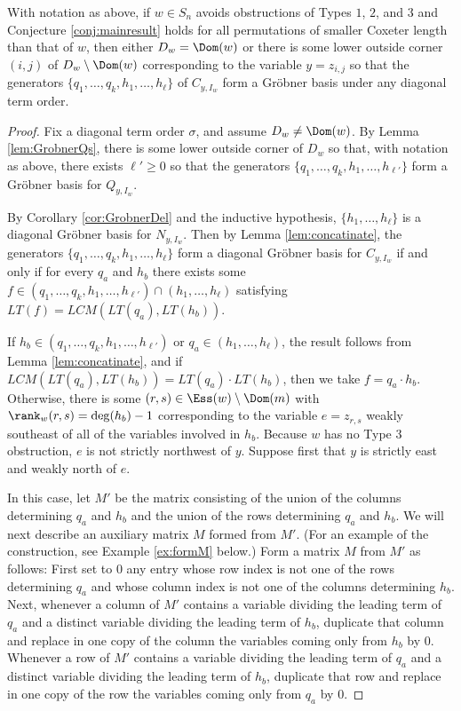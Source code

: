 \begin{lemma}\label{lem:GrobnerLink}
With notation as above, if $w \in S_n$ avoids obstructions of Types $1$, $2$, and $3$ and Conjecture \ref{conj:mainresult} holds for all permutations of smaller Coxeter length than that of $w$, then either $D_w = \Dom(w)$ or there is some lower outside corner $(i,j)$ of $D_w \setminus \Dom(w)$ corresponding to the variable $y = z_{i,j}$ so that the generators $\{q_1, \ldots, q_k, h_1, \ldots, h_\ell\}$ of $C_{y,I_w}$ form a Gr\"obner basis under any diagonal term order.
\end{lemma}
\begin{proof}
Fix a diagonal term order $\sigma$, and assume $D_w \neq \Dom(w)$.  By Lemma \ref{lem:GrobnerQs}, there is some lower outside corner of $D_w$ so that, with notation as above, there exists $\ell' \geq 0$ so that the generators $\{q_1, \ldots, q_k, h_1, \ldots, h_{\ell'} \}$ form a Gr\"obner basis for $Q_{y,I_w}$.  

By Corollary \ref{cor:GrobnerDel} and the inductive hypothesis, $\{h_1,\ldots, h_\ell\}$ is a diagonal Gr\"obner basis for $N_{y,I_w}$.  Then by Lemma \ref{lem:concatinate}, the generators $\{q_1, \ldots, q_k, h_1, \ldots, h_\ell\}$ form a diagonal Gr\"obner basis for $C_{y,I_w}$ if and only if for every $q_a$ and $h_b$ there exists some $f \in (q_1, \ldots, q_k, h_1, \ldots, h_{\ell'}) \cap (h_1, \ldots, h_\ell)$ satisfying $LT(f) = LCM(LT(q_a),LT(h_b))$.  

If $h_b \in (q_1, \ldots, q_k, h_1, \ldots, h_{\ell'})$ or $q_a \in (h_1, \ldots, h_\ell)$, the result follows from Lemma \ref{lem:concatinate}, and if $LCM(LT(q_a),LT(h_b)) = LT(q_a) \cdot LT(h_b)$, then we take $f = q_a \cdot h_b$.  Otherwise, there is some $(r,s) \in \Ess(w) \setminus \Dom(m)$ with $\rank_w(r,s) = \deg(h_b)-1$ corresponding to the variable $e = z_{r,s}$ weakly southeast of all of the variables involved in $h_b$.  Because $w$ has no Type $3$ obstruction, $e$ is not strictly northwest of $y$.  Suppose first that $y$ is strictly east and weakly north of $e$.

In this case, let $M'$ be the matrix consisting of the union of the columns determining $q_a$ and $h_b$ and the union of the rows determining $q_a$ and $h_b$.  We will next describe an auxiliary matrix $M$ formed from $M'$. (For an example of the construction, see Example \ref{ex:formM} below.)  Form a matrix $M$ from $M'$ as follows: First set to $0$ any entry whose row index is not one of the rows determining $q_a$ and whose column index is not one of the columns determining $h_b$.  Next, whenever a column of $M'$ contains a variable dividing the leading term of $q_a$ and a distinct variable dividing the leading term of $h_b$, duplicate that column and replace in one copy of the column the variables coming only from $h_b$ by $0$.  Whenever a row of $M'$ contains a variable dividing the leading term of $q_a$ and a distinct variable dividing the leading term of $h_b$, duplicate that row and replace in one copy of the row the variables coming only from $q_a$ by $0$.  


\end{proof}
